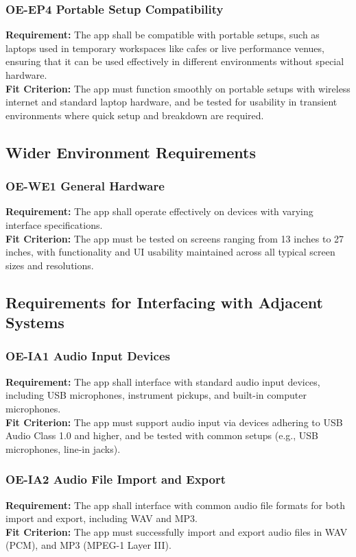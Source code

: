 \documentclass[12pt]{article}
\begin{document}
\subsubsection*{OE-EP4 Portable Setup Compatibility}
\textbf{Requirement:} The app shall be compatible with portable setups, such as laptops used in temporary workspaces like cafes or live performance venues, ensuring that it can be used effectively in different environments without special hardware.\\
\textbf{Fit Criterion:} The app must function smoothly on portable setups with wireless internet and standard laptop hardware, and be tested for usability in transient environments where quick setup and breakdown are required.

\subsection{Wider Environment Requirements}
\subsubsection*{OE-WE1 General Hardware}
\textbf{Requirement:} The app shall operate effectively on devices with varying interface specifications.\\
\textbf{Fit Criterion:} The app must be tested on screens ranging from 13 inches to 27 inches, with functionality and UI usability maintained across all typical screen sizes and resolutions.

\subsection{Requirements for Interfacing with Adjacent Systems}
\subsubsection*{OE-IA1 Audio Input Devices}
\textbf{Requirement:} The app shall interface with standard audio input devices, including USB microphones, instrument pickups, and built-in computer microphones.\\
\textbf{Fit Criterion:} The app must support audio input via devices adhering to USB Audio Class 1.0 and higher, and be tested with common setups (e.g., USB microphones, line-in jacks).\\
\subsubsection*{OE-IA2 Audio File Import and Export}
\textbf{Requirement:} The app shall interface with common audio file formats for both import and export, including WAV and MP3.\\
\textbf{Fit Criterion:} The app must successfully import and export audio files in WAV (PCM), and MP3 (MPEG-1 Layer III).\\
\end{document}
